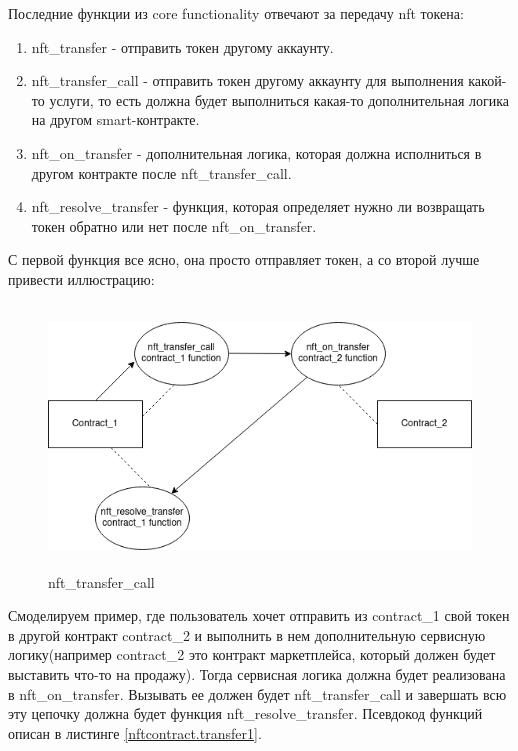 Последние функции из core functionality отвечают за передачу nft токена:
\begin{enumerate}
\item nft\_transfer - отправить токен другому аккаунту.
\item nft\_transfer\_call - отправить токен другому аккаунту для выполнения какой-то услуги, то есть должна будет выполниться какая-то дополнительная логика на другом smart-контракте.
\item nft\_on\_transfer - дополнительная логика, которая должна исполниться в другом контракте после nft\_transfer\_call.
\item nft\_resolve\_transfer - функция, которая определяет нужно ли возвращать токен обратно или нет после nft\_on\_transfer.
\end{enumerate}
С первой функция все ясно, она просто отправляет токен, а со второй лучше привести иллюстрацию:

\begin{figure}[H]
	\centering
	\includegraphics[height=70mm]{fig/temp.png}
	\caption{nft\_transfer\_call}
\end{figure}

Смоделируем пример, где пользователь хочет отправить из contract\_1 свой токен в другой контракт contract\_2 и выполнить в нем дополнительную сервисную логику(например contract\_2 это контракт маркетплейса, который должен будет выставить что-то на продажу).
Тогда сервисная логика должна будет реализована в nft\_on\_transfer. Вызывать ее должен будет nft\_transfer\_call и завершать всю эту цепочку должна будет функция nft\_resolve\_transfer.
Псевдокод функций описан в листинге {\color{blue}\ref{nftcontract.transfer1}}.

